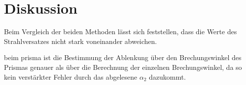 \section{Diskussion}
\label{sec:Diskussion}
Beim Vergleich der beiden Methoden lässt sich feststellen, dass die Werte des Strahlversatzes nicht stark voneinander abweichen.

beim prisma ist die Bestimmung der Ablenkung über den Brechungswinkel des Prismas genauer als über die Berechnung der einzelnen
Brechungswinkel, da so kein verstärkter Fehler durch das abgelesene $\alpha_2$ dazukommt.